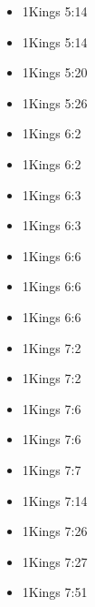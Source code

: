 \documentclass[14pt]{book}
\begin{document}
\begin{multicols}{2}
\begin{itemize}
									\item 1Kings 5:14
									
									\item 1Kings 5:14
									
									\item 1Kings 5:20
									
									\item 1Kings 5:26
									
									\item 1Kings 6:2
									
									\item 1Kings 6:2
									
									\item 1Kings 6:3
									
									\item 1Kings 6:3
									
									\item 1Kings 6:6
									
									\item 1Kings 6:6
									
									\item 1Kings 6:6
									
									\item 1Kings 7:2
									
									\item 1Kings 7:2
									
									\item 1Kings 7:6
									
									\item 1Kings 7:6
									
									\item 1Kings 7:7
									
									\item 1Kings 7:14
									
									\item 1Kings 7:26
									
									\item 1Kings 7:27
									
									\item 1Kings 7:51
									

\end{itemize}
\end{multicols}
\end{document}
